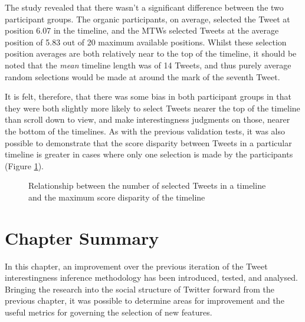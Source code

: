 The study revealed that there wasn't a significant difference between the two participant groups. The organic participants, on average, selected the Tweet at position 6.07 in the timeline, and the MTWs selected Tweets at the average position of 5.83 out of 20 maximum available positions.
Whilst these selection position averages are both relatively near to the top of the timeline, it should be noted that the \textit{mean} timeline length was of 14 Tweets, and thus purely average random selections would be made at around the mark of the seventh Tweet.

It is felt, therefore, that there was some bias in both participant groups in that they were both slightly more likely to select Tweets nearer the top of the timeline than scroll down to view, and make interestingness judgments on those, nearer the bottom of the timelines. As with the previous validation tests, it was also possible to demonstrate that the score disparity between Tweets in a particular timeline is greater in cases where only one selection is made by the participants (Figure \ref{fig:disparity2}). 

\begin{figure}
    \centering
\caption{Relationship between the number of selected Tweets in a timeline and the maximum score disparity of the timeline}
\label{fig:disparity2}
\end{figure}


\section{Chapter Summary}
In this chapter, an improvement over the previous iteration of the Tweet interestingness inference methodology has been introduced, tested, and analysed. Bringing the research into the social structure of Twitter forward from the previous chapter, it was possible to determine areas for improvement and the useful metrics for governing the selection of new features.

